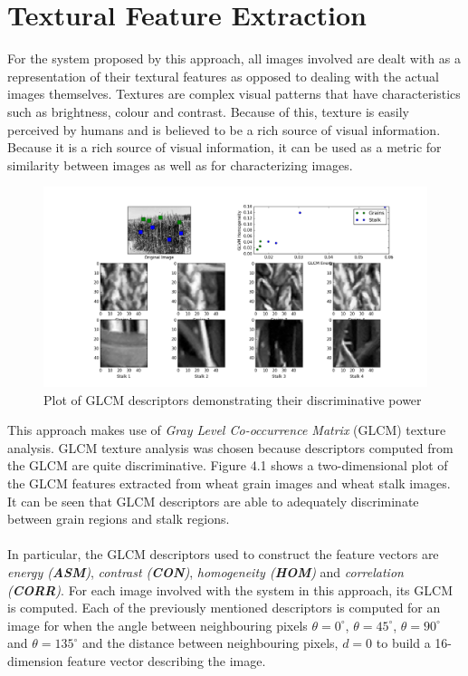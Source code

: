 \section{Textural Feature Extraction}
For the system proposed by this approach, all images involved are dealt with as a representation of their textural features as opposed to dealing with the actual images themselves. Textures are complex visual patterns that have characteristics such as brightness, colour and contrast. Because of this, texture is easily perceived by humans and is believed to be a rich source of visual information. Because it is a rich source of visual information, it can be used as a metric for similarity between images as well as for characterizing images. 
\begin{figure}[ht!]
\centering
\includegraphics[scale=0.3]{glcm_1}
\caption{Plot of GLCM descriptors demonstrating their discriminative power}
\label{fig1}
\end{figure}
This approach makes use of \textit{Gray Level Co-occurrence Matrix} (GLCM) texture analysis. GLCM texture analysis was chosen because descriptors computed from the GLCM are quite discriminative. Figure 4.1 shows a two-dimensional plot of the GLCM features extracted from wheat grain images and wheat stalk images. It can be seen that GLCM descriptors are able to adequately discriminate between grain regions and stalk regions.\\ \\
%
In particular, the GLCM descriptors used to construct the feature vectors are \textit{energy (\textbf{ASM})}, \textit{contrast (\textbf{CON})}, \textit{homogeneity (\textbf{HOM})} and \textit{correlation (\textbf{CORR})}. For each image involved with the system in this approach, its GLCM is computed. Each of the previously mentioned descriptors is computed for an image for when the angle between neighbouring pixels $\theta = 0^\circ$, $\theta = 45^\circ$, $\theta = 90^\circ$ and $\theta = 135^\circ$ and the distance between neighbouring pixels, $d = 0$ to build a 16-dimension feature vector describing the image.

